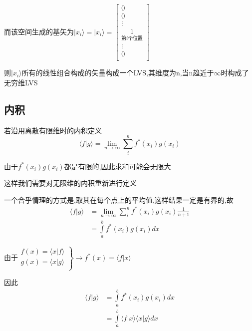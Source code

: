 \documentclass[lang=cn,15pt]{elegantbook}
\begin{document}
而该空间生成的基矢为$|x_i\rangle=|x_i\rangle =\left[ \begin{array}{c}
	0\\
	0\\
	\vdots\\
	\mathop 1 \limits_{\text{第}i\text{个位置}}\\
	\vdots\\
	0\\
\end{array} \right]$

则$|x_i\rangle$所有的线性组合构成的矢量构成一个LVS,其维度为n,当n趋近于$\infty$时构成了无穷维LVS
\subsection{内积}

若沿用离散有限维时的内积定义
\begin{equation*}
	\langle f|g\rangle =\underset{n\rightarrow \infty}{\lim}\sum_i^n{f^*\left( x_i \right) g\left( x_i \right)}
\end{equation*}

由于$f^*\left( x_i \right) g\left( x_i \right)$都是有限的,因此求和可能会无限大

这样我们需要对无限维的内积重新进行定义

一个合乎情理的方式是,取其在每个点上的平均值,这样结果一定是有界的,故
\begin{equation*}
	\begin{split}
		\langle f|g\rangle &=\underset{n\rightarrow \infty}{\lim}\sum_i^n{f^*\left( x_i \right) g\left( x_i \right)}\frac{1}{n+1}
		\\
		&=\int\limits_a^b{f^*\left( x_i \right) g\left( x_i \right) dx}
	\end{split}
\end{equation*}

由于$\left. \begin{array}{r}
	f\left( x \right) =\langle x|f\rangle\\
	g\left( x \right) =\langle x|g\rangle\\
\end{array} \right\} \rightarrow f^*\left( x \right) =\langle f|x\rangle 
$

因此
\begin{equation*}
	\begin{split}
		\langle f|g\rangle &=\int\limits_a^b{f^*\left( x_i \right) g\left( x_i \right) dx}
		\\
		&=\int\limits_a^b{\langle f|x\rangle \langle x|g\rangle dx}	
	\end{split}
\end{equation*}
\end{document}
